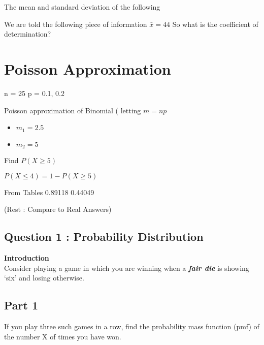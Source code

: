 
The mean and standard deviation of the following

We are told the following piece of information $\bar{x} = 44$
So what is the coefficient of determination?


\section{Poisson Approximation}

n  = 25
p = 0.1, 0.2

Poisson approximation of Binomial ( letting $m=np$

\begin{itemize}
\item $m_1 = 2.5$
\item $m_2 = 5$
\end{itemize}

Find $P(X\geq 5)$ 

$ P(X\leq 4)  = 1 - P(X\geq 5) $

From Tables 
0.89118
0.44049

(Rest : Compare to Real Answers)






\subsection{Question 1 : Probability Distribution}

\noindent \textbf{Introduction}\\

Consider playing a game in which you are winning when a \textbf{\emph{fair die}} is showing `six'
and losing otherwise.

\subsection{Part 1}If you play three such games in a row, find the probability mass function (pmf) of the number
X of times you have won.

